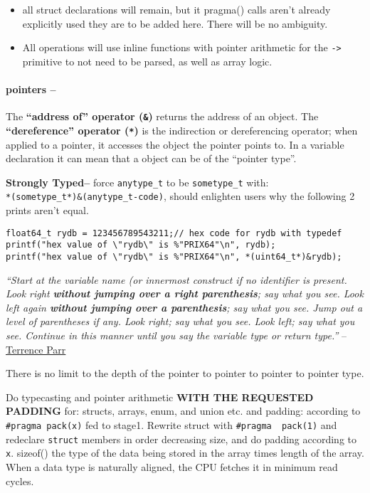 \begin{itemize}
\tightlist
\item
  all struct declarations will remain, but it pragma() calls aren't
  already explicitly used they are to be added here. There will be no
  ambiguity.
\item
  All operations will use inline functions with pointer arithmetic for
  the \texttt{-\textgreater{}} primitive to not need to be parsed, as
  well as array logic.
\end{itemize}

\hypertarget{pointers}{%
\paragraph{pointers --}\label{pointers}}

The \textbf{``address of'' operator (\texttt{\&})} returns the address
of an object. The \textbf{``dereference'' operator (\texttt{*})} is the
indirection or dereferencing operator; when applied to a pointer, it
accesses the object the pointer points to. In a variable declaration it
can mean that a object can be of the ``pointer type''.

\textbf{Strongly Typed--} force \texttt{anytype\_t} to be
\texttt{sometype\_t} with:\\
\texttt{*(sometype\_t*)\&(anytype\_t-code)}, should enlighten users why
the following 2 prints aren't equal.

\begin{verbatim}
float64_t rydb = 123456789543211;// hex code for rydb with typedef
printf("hex value of \"rydb\" is %"PRIX64"\n", rydb);
printf("hex value of \"rydb\" is %"PRIX64"\n", *(uint64_t*)&rydb);
\end{verbatim}

\emph{``Start at the variable name (or innermost construct if no
identifier is present. Look right \textbf{without jumping over a right
parenthesis}; say what you see. Look left again \textbf{without jumping
over a parenthesis}; say what you see. Jump out a level of parentheses
if any. Look right; say what you see. Look left; say what you see.
Continue in this manner until you say the variable type or return
type.''}
--\href{https://parrt.cs.usfca.edu/doc/how-to-read-C-declarations.html}{Terrence
Parr}

There is no limit to the depth of the pointer to pointer to pointer to
pointer type.

Do typecasting and pointer arithmetic \textbf{WITH THE REQUESTED
PADDING} for: structs, arrays, enum, and union etc. and padding:
according to \texttt{\#pragma\ pack(x)} fed to stage1. Rewrite struct
with \texttt{\#pragma\ \ pack(1)} and redeclare \texttt{struct} members
in order decreasing size, and do padding according to \texttt{x}.
sizeof() the type of the data being stored in the array times length of
the array. When a data type is naturally aligned, the CPU fetches it in
minimum read cycles.

